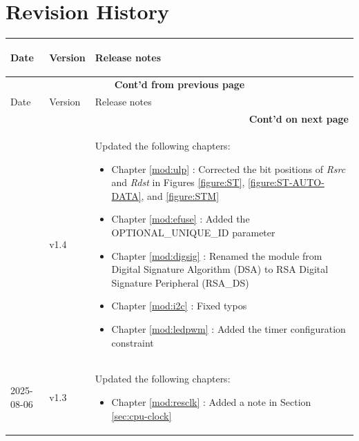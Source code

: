 \section*{Revision History}\label{revision-history}
\rhead{\Navigation}

\begin{longtable}[l]{ | m{2cm} | m{1.5cm} | m{12cm} | } \hline

    \rowcolor{lightgray}
    Date & Version & \hypertarget{Release notes}{Release notes}\\\hline
    \endfirsthead

    \multicolumn{3}{c}{\bfseries Cont'd from previous page}\\\hline
    \rowcolor{lightgray}
    Date & Version & Release notes\\\hline
    \endhead

    \multicolumn{3}{r}{\textbf{Cont'd on next page}}\\
    \endfoot

    \endlastfoot

     & v1.4 &
    Updated the following chapters:
    \begin{itemize}
        \item Chapter \ref{mod:ulp} \textit{\nameref{mod:ulp}}: Corrected the bit positions of \textit{Rsrc} and \textit{Rdst} in Figures \ref{figure:ST}, \ref{figure:ST-AUTO-DATA}, and \ref{figure:STM} %
        \item Chapter \ref{mod:efuse} \textit{\nameref{mod:efuse}}: Added the OPTIONAL\_UNIQUE\_ID parameter %
        \item Chapter \ref{mod:digsig} \textit{\nameref{mod:digsig}}: Renamed the module from Digital Signature Algorithm (DSA) to RSA Digital Signature Peripheral (RSA\_DS) %
        \item Chapter \ref{mod:i2c} \textit{\nameref{mod:i2c}}: Fixed typos %
        \item Chapter \ref{mod:ledpwm} \textit{\nameref{mod:ledpwm}}: Added the timer configuration constraint %
    \end{itemize}
    \\\hline
    2025-08-06 & v1.3 &
    Updated the following chapters:
    \begin{itemize}
        \item Chapter \ref{mod:resclk} \textit{\nameref{mod:resclk}}: Added a note in Section \ref{sec:cpu-clock} \textit{\nameref{sec:cpu-clock}}
    \end{itemize}


\end{longtable}
